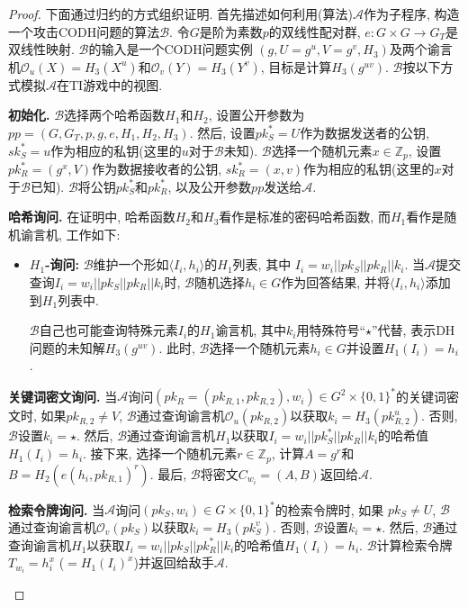 \begin{proof}
下面通过归约的方式组织证明. 首先描述如何利用(算法)$\mathcal{A}$作为子程序, 构造一个攻击CODH问题的算法$\mathcal{B}$. 令$G$是阶为素数$p$的双线性配对群, $e: G \times G \rightarrow G_T$是双线性映射. $\mathcal{B}$的输入是一个CODH问题实例 $(g, U=g^u, V=g^v, H_3)$及两个谕言机$\mathcal{O}_u(X) = H_3(X^u)$和$\mathcal{O}_v(Y) = H_3(Y^v)$, 目标是计算$H_3(g^{uv})$. $\mathcal{B}$按以下方式模拟$\mathcal{A}$在TI游戏中的视图.  

\begin{trivlist}
\item \textbf{初始化.} $\mathcal{B}$选择两个哈希函数$H_1$和$H_2$, 设置公开参数为$pp = (G, G_T, p, g, e, H_1, H_2, H_3)$. 然后, 设置$pk_S^*=U$作为数据发送者的公钥, $sk_S^* = u$作为相应的私钥(这里的$u$对于$\mathcal{B}$未知). $\mathcal{B}$选择一个随机元素$x \in \mathbb{Z}_p$, 设置$pk_R^* = (g^x, V)$作为数据接收者的公钥, $sk_R^* = (x, v)$作为相应的私钥(这里的$x$对于$\mathcal{B}$已知). $\mathcal{B}$将公钥$pk_S^*$和$pk_R^*$, 以及公开参数$pp$发送给$\mathcal{A}$.

\item \textbf{哈希询问.} 在证明中, 哈希函数$H_2$和$H_3$看作是标准的密码哈希函数, 而$H_1$看作是随机谕言机, 工作如下:
\begin{itemize}
\item \textbf{$H_1$-询问:} $\mathcal{B}$维护一个形如$\langle I_i, h_i\rangle$的$H_1$列表, 其中 $I_i = w_i||pk_S||pk_R||k_i$. 当$\mathcal{A}$提交查询$I_i = w_i||pk_S||pk_R||k_i$时, $\mathcal{B}$随机选择$h_i \in G$作为回答结果, 并将$\langle I_i, h_i\rangle$添加到$H_1$列表中.

$\mathcal{B}$自己也可能查询特殊元素$I_i$的$H_1$谕言机, 其中$k_i$用特殊符号``$\star$''代替, 表示DH问题的未知解$H_3(g^{uv})$. 此时, $\mathcal{B}$选择一个随机元素$h_i \in G$并设置$H_1(I_i) = h_i$.
\end{itemize}

\item \textbf{关键词密文询问.} 当$\mathcal{A}$询问$(pk_R=(pk_{R,1}, pk_{R,2}), w_i) \in G^2 \times \{0, 1\}^*$的关键词密文时, 如果$pk_{R,2} \neq V$, $\mathcal{B}$通过查询谕言机$\mathcal{O}_u(pk_{R,2})$以获取$k_i = H_3(pk_{R,2}^u)$. 否则, $\mathcal{B}$设置$k_i = \star$. 然后, $\mathcal{B}$通过查询谕言机$H_1$以获取$I_i = w_i||pk_S^*||pk_R||k_i$的哈希值$H_1(I_i) = h_i$. 接下来, 选择一个随机元素$r \in \mathbb{Z}_p$, 计算$A = g^r$和$B = H_2(e(h_i, pk_{R,1})^r)$. 最后, $\mathcal{B}$将密文$C_{w_i} = (A, B)$返回给$\mathcal{A}$.

\item \textbf{检索令牌询问.} 当$\mathcal{A}$询问$(pk_S, w_i) \in G\times\{0, 1\}^*$的检索令牌时, 如果 $pk_S \neq U$, $\mathcal{B}$通过查询谕言机$\mathcal{O}_v(pk_S)$以获取$k_i = H_3(pk_S^v)$. 否则, $\mathcal{B}$设置$k_i = \star$. 然后, $\mathcal{B}$通过查询谕言机$H_1$以获取$I_i = w_i||pk_S||pk_R^*||k_i$的哈希值$H_1(I_i) = h_i$. $\mathcal{B}$计算检索令牌$T_{w_i} = h_i^x$ ($= H_1(I_i)^x$)并返回给敌手$\mathcal{A}$.


\end{trivlist}
\end{proof}
